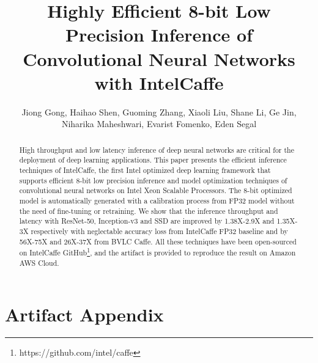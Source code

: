 \documentclass[sigplan]{acmart}
\begin{document}
\title{Highly Efficient 8-bit Low Precision Inference of Convolutional Neural Networks with IntelCaffe}

\author{Jiong Gong, Haihao Shen, Guoming Zhang, Xiaoli Liu, Shane Li, Ge Jin, Niharika Maheshwari, Evarist Fomenko, Eden Segal}

\renewcommand{\shortauthors}{}
\renewcommand{\shorttitle}{}

\begin{abstract}
High throughput and low latency inference of deep neural networks are critical for the deployment of deep learning applications. This paper presents the efficient inference techniques of IntelCaffe, the first Intel\textsuperscript{\textregistered} optimized deep learning framework that supports efficient 8-bit low precision inference and model optimization techniques of convolutional neural networks on Intel\textsuperscript{\textregistered} Xeon\textsuperscript{\textregistered} Scalable Processors. The 8-bit optimized model is automatically generated with a calibration process from FP32 model without the need of fine-tuning or retraining. We show that the inference throughput and latency with ResNet-50, Inception-v3 and SSD are improved by 1.38X-2.9X and 1.35X-3X respectively with neglectable accuracy loss from IntelCaffe FP32 baseline and by 56X-75X and 26X-37X from BVLC Caffe. All these techniques have been open-sourced on IntelCaffe GitHub\footnote{https://github.com/intel/caffe}, and the artifact is provided to reproduce the result on Amazon AWS Cloud.
\end{abstract}


\maketitle






\newpage

\onecolumn

\appendix
\section{Artifact Appendix}
\end{document}
